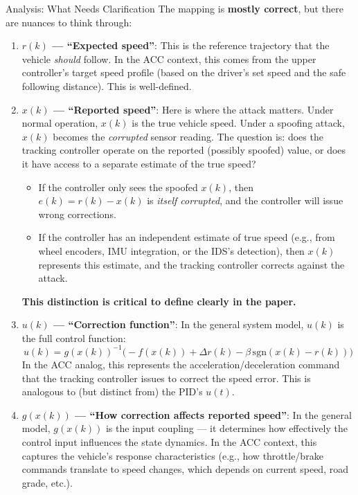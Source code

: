 \begin{mathbox}{Analysis: What Needs Clarification}
	The mapping is \textbf{mostly correct}, but there are nuances to think through:
	
	\begin{enumerate}[label=\textbf{\arabic*.}]
		\item \textbf{$r(k)$ --- ``Expected speed''}: This is the reference trajectory that the vehicle \emph{should} follow. In the ACC context, this comes from the upper controller's target speed profile (based on the driver's set speed and the safe following distance). This is well-defined.
		      
		\item \textbf{$x(k)$ --- ``Reported speed''}: Here is where the attack matters. Under normal operation, $x(k)$ is the true vehicle speed. Under a spoofing attack, $x(k)$ becomes the \emph{corrupted} sensor reading. The question is: does the tracking controller operate on the reported (possibly spoofed) value, or does it have access to a separate estimate of the true speed?
		      
		      \begin{itemize}
			      \item If the controller only sees the spoofed $x(k)$, then $e(k) = r(k) - x(k)$ is \emph{itself corrupted}, and the controller will issue wrong corrections.
			      \item If the controller has an independent estimate of true speed (e.g., from wheel encoders, IMU integration, or the IDS's detection), then $x(k)$ represents this estimate, and the tracking controller corrects against the attack.
		      \end{itemize}
		      
		      \textbf{This distinction is critical to define clearly in the paper.}
		      
		\item \textbf{$u(k)$ --- ``Correction function''}: In the general system model, $u(k)$ is the full control function:
		      \[
			      u(k) = g(x(k))^{-1}\bigl(-f(x(k)) + \Delta r(k) - \beta\,\text{sgn}(x(k) - r(k))\bigr)
		      \]
		      In the ACC analog, this represents the acceleration/deceleration command that the tracking controller issues to correct the speed error. This is analogous to (but distinct from) the PID's $u(t)$.
		      
		\item \textbf{$g(x(k))$ --- ``How correction affects reported speed''}: In the general model, $g(x(k))$ is the input coupling --- it determines how effectively the control input influences the state dynamics. In the ACC context, this captures the vehicle's response characteristics (e.g., how throttle/brake commands translate to speed changes, which depends on current speed, road grade, etc.).
	\end{enumerate}
\end{mathbox}
